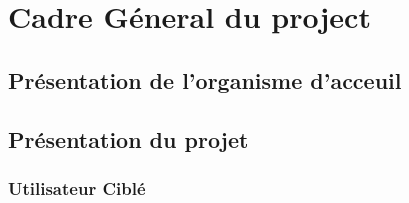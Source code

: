 
\chapter{Cadre Géneral du project}
\section{Présentation de l'organisme d'acceuil}
\section{Présentation du projet}
\subsection{Utilisateur Ciblé}